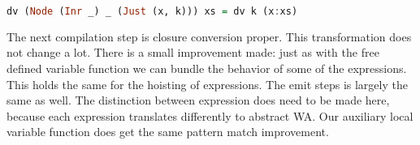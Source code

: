 \begin{lstlisting}[language=Haskell]
dv (Node (Inr _) _ (Just (x, k))) xs = dv k (x:xs)
\end{lstlisting}

The next compilation step is closure conversion proper. This transformation does not change a lot. There is a small improvement made: just as with the free defined variable function we can bundle the behavior of some of the  expressions. This holds the same for the hoisting of  expressions. The emit steps is largely the same as well. The distinction between  expression does need to be made here, because each expression translates differently to abstract \ac{WA}. Our auxiliary local variable function does get the same pattern match improvement.

